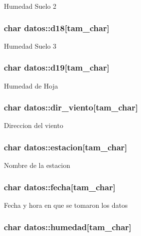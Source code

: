 Humedad Suelo 2 \hypertarget{structdatos_afc3ba8d8ebf6e2a4127ecf050348eeef}{
\subsubsection[{d18}]{\setlength{\rightskip}{0pt plus 5cm}char datos\-::d18\mbox{[}tam\-\_\-char\mbox{]}}}\label{structdatos_afc3ba8d8ebf6e2a4127ecf050348eeef}
Humedad Suelo 3 \hypertarget{structdatos_a9e32be25b58f3d2d8df09d5805a0caaf}{
\subsubsection[{d19}]{\setlength{\rightskip}{0pt plus 5cm}char datos\-::d19\mbox{[}tam\-\_\-char\mbox{]}}}\label{structdatos_a9e32be25b58f3d2d8df09d5805a0caaf}
Humedad de Hoja \hypertarget{structdatos_a8094cc27cfac961fc5770f12a558cb75}{
\subsubsection[{dir\-\_\-viento}]{\setlength{\rightskip}{0pt plus 5cm}char datos\-::dir\-\_\-viento\mbox{[}tam\-\_\-char\mbox{]}}}\label{structdatos_a8094cc27cfac961fc5770f12a558cb75}
Direccion del viento \hypertarget{structdatos_a29ea9f9a82a90d3da6775773661e5134}{
\subsubsection[{estacion}]{\setlength{\rightskip}{0pt plus 5cm}char datos\-::estacion\mbox{[}tam\-\_\-char\mbox{]}}}\label{structdatos_a29ea9f9a82a90d3da6775773661e5134}
Nombre de la estacion \hypertarget{structdatos_aa0c7c5c19eca865ae03abfdb0ffd03e5}{
\subsubsection[{fecha}]{\setlength{\rightskip}{0pt plus 5cm}char datos\-::fecha\mbox{[}tam\-\_\-char\mbox{]}}}\label{structdatos_aa0c7c5c19eca865ae03abfdb0ffd03e5}
Fecha y hora en que se tomaron los datos \hypertarget{structdatos_a7646bd9c4887870ecf99d8b8ea085fd6}{
\subsubsection[{humedad}]{\setlength{\rightskip}{0pt plus 5cm}char datos\-::humedad\mbox{[}tam\-\_\-char\mbox{]}}}\label{structdatos_a7646bd9c4887870ecf99d8b8ea085fd6}
